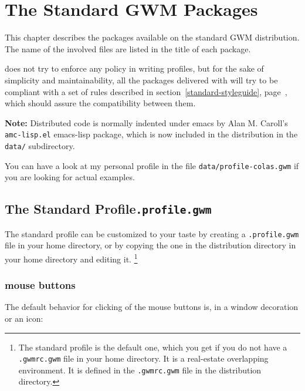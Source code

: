 \chapter{The Standard GWM Packages}

\sloppy

This chapter describes the {\WOOL} packages available on the standard GWM
distribution. The name of the involved files are listed in the title of each
package.

{\GWM} does not try to enforce any policy in writing profiles, but for the
sake of simplicity and maintainability, all the {\WOOL} packages delivered
with {\GWM} will try to be compliant with a set of rules described in
section~\ref{standard-styleguide}, page~\pageref{standard-styleguide}, which
should assure the compatibility between them.

{\bf Note:} Distributed code is normally indented under emacs by Alan M.
Caroll's \verb|amc-lisp.el| emacs-lisp package, which is now included in the
{\GWM} distribution in the \verb|data/| subdirectory.

You can have a look at my personal profile in the file
\verb|data/profile-colas.gwm| if you are looking for actual examples.

\section{The Standard Profile\hfill{\tt .profile.gwm}}
\label{standard-profile}

The standard profile can be customized to your taste by creating a
\verb".profile.gwm" file in your home directory, or by copying the one in
the {\GWM} distribution directory in your home directory and editing it.
\footnote{The standard profile is the default one, which you get if you do
not have a \verb".gwmrc.gwm" file in your home directory. It is a
real-estate overlapping environment. It is defined in the \verb".gwmrc.gwm"
file in the {\GWM} distribution directory.}

\subsection{mouse buttons}

The default behavior for clicking of the mouse buttons is, in a window
decoration or an icon:

